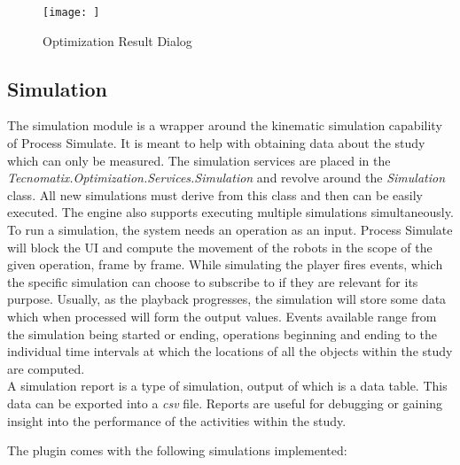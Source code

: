 \begin{figure}[ht]
	\caption{Optimization Result Dialog}
	\centering
	\texttt{[image: ]}
	\label{fig:DialogOptimizationResult}
\end{figure}

\subsection{Simulation}

The simulation module is a wrapper around the kinematic simulation capability of Process Simulate. It is meant to help with obtaining data about the study which can only be measured. The simulation services are placed in the \emph{Tecnomatix.Optimization.Services.Simulation} and revolve around the \emph{Simulation} class. All new simulations must derive from this class and then can be easily executed. The engine also supports executing multiple simulations simultaneously. \\

To run a simulation, the system needs an operation as an input. Process Simulate will block the UI and compute the movement of the robots in the scope of the given operation, frame by frame. While simulating the player fires events, which the specific simulation can choose to subscribe to if they are relevant for its purpose. Usually, as the playback progresses, the simulation will store some data which when processed will form the output values. Events available range from the simulation being started or ending, operations beginning and ending to the individual time intervals at which the locations of all the objects within the study are computed. \\

A simulation report is a type of simulation, output of which is a data table. This data can be exported into a \emph{csv} file. Reports are useful for debugging or gaining insight into the performance of the activities within the study.

The plugin comes with the following simulations implemented:

